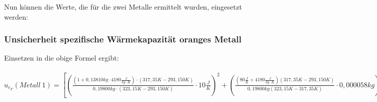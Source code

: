 \documentclass[
  9pt,
]{article}
\begin{document}
Nun können die Werte, die für die zwei Metalle ermittelt wurden,
eingesetzt werden:

\hypertarget{unsicherheit-spezifische-wuxe4rmekapazituxe4t-oranges-metall}{%
\subsubsection{Unsicherheit spezifische Wärmekapazität oranges
Metall}\label{unsicherheit-spezifische-wuxe4rmekapazituxe4t-oranges-metall}}

Einsetzen in die obige Formel ergibt:

\(u_{c_F}(Metall\ 1)=[(\frac{(1+0,13810kg\cdot 4180\frac{J}{kg\cdot K})\cdot (317,35K-293,150K)}{0,19800kg\cdot (323,15K-293,150K)}\cdot 10\frac{J}{K})^2+(\frac{(80\frac{J}{K}+4180\frac{J}{kg\cdot K})(317,35K-293,150K)}{0,19800kg(323,15K-317,35K)}\cdot 0,000058kg)^2+(\frac{(80\frac{J}{K}+0,13810kg\cdot 4180\frac{J}{kg\cdot K})\cdot (1-293,150K)}{0,19800kg(323,15K-1)}\cdot 0,029K)^2+(\frac{(80\frac{J}{K}+0,13810kg\cdot 4180\frac{J}{kg\cdot K})\cdot (317,35K-1)}{0,19800kg(323,15K-317,35K)}\cdot 0,029K)^2+(\frac{(80\frac{J}{K}+0,13810kg\cdot 4180\frac{J}{kg\cdot K})\cdot (317,35K-293,150K)}{323,15K-317,35K}\cdot 0,000029kg)^2+(\frac{(80\frac{J}{K}+0,13810kg\cdot 4180\frac{J}{kg\cdot K})\cdot (317,35K-293,150K)}{0,19800kg(1-317,35K)}\cdot 0,029K)^2]^{\frac{1}{2}}\)

\newpage
\end{document}
